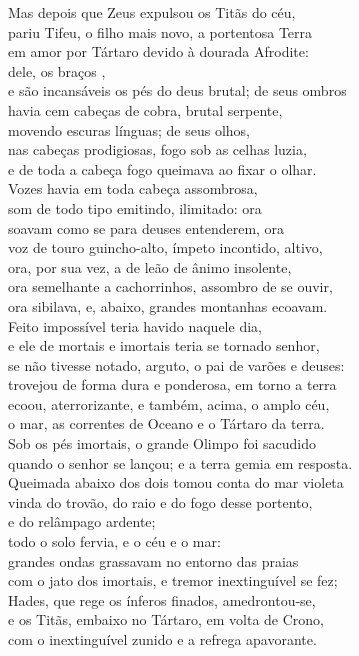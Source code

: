 \begin{pages}
\begin{Rightside}
\Para
Mas depois que Zeus expulsou os Titãs do céu, \\
pariu Tifeu, o filho mais novo, a portentosa Terra\\
em amor por Tártaro devido à dourada Afrodite:\\
dele, os braços \dagger{}\dagger{},\\
e são incansáveis os pés do deus brutal; de seus ombros\\
havia cem cabeças de cobra, brutal serpente, \\
movendo escuras línguas; de seus olhos,\\
nas cabeças prodigiosas, fogo sob as celhas luzia,\\
e de toda a cabeça fogo queimava ao fixar o olhar.\\
Vozes havia em toda cabeça assombrosa,\\
som de todo tipo emitindo, ilimitado: ora \\
soavam como se para deuses entenderem, ora\\
voz de touro guincho-alto, ímpeto incontido, altivo,\\
ora, por sua vez, a de leão de ânimo insolente,\\
ora semelhante a cachorrinhos, assombro de se ouvir,\\
ora sibilava, e, abaixo, grandes montanhas ecoavam. \\
Feito impossível teria havido naquele dia,\\
e ele de mortais e imortais teria se tornado senhor,\\
se não tivesse notado, arguto, o pai de varões e deuses:\\
trovejou de forma dura e ponderosa, em torno a terra\\
ecoou, aterrorizante, e também, acima, o amplo céu, \\
o mar, as correntes de Oceano e o Tártaro da terra.\\
Sob os pés imortais, o grande Olimpo foi sacudido\\
quando o senhor se lançou; e a terra gemia em resposta.\\
Queimada abaixo dos dois tomou conta do mar violeta\\
vinda do trovão, do raio e do fogo desse portento, \\
 e do relâmpago ardente;\\
todo o solo fervia, e o céu e o mar:\\
grandes ondas grassavam no entorno das praias\\
com o jato dos imortais, e tremor inextinguível se fez;\\
Hades, que rege os ínferos finados, amedrontou-se, \\
e os Titãs, embaixo no Tártaro, em volta de Crono,\\
com o inextinguível zunido e a refrega apavorante.\\


\end{Rightside}
\end{pages}
